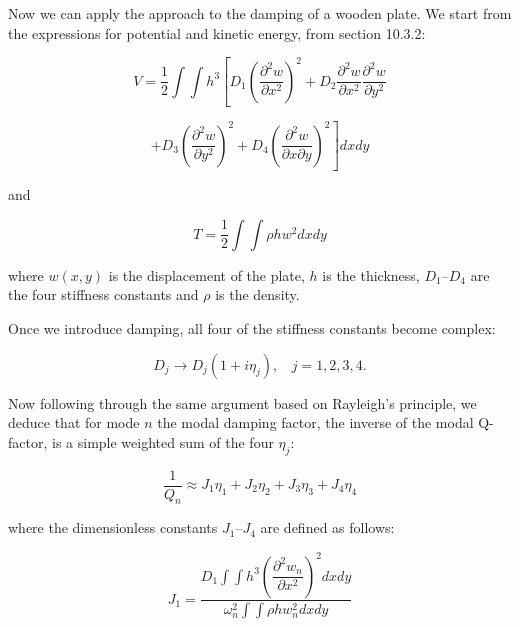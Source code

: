   Now we can apply the approach to the damping of a wooden plate. We start from 
  the expressions for potential and kinetic energy, from section 10.3.2: 

  \begin{equation*} V = \dfrac{1}{2} \int{\int{h^3 \left[ D_1 
  \left(\dfrac{\partial^2 w}{\partial x^2} \right)^2 + D_2 \dfrac{\partial^2 
  w}{\partial x^2} \dfrac{\partial^2 w}{\partial y^2} \right. }} 
  \end{equation*} 

  \begin{equation*} \left. + D_3 \left(\dfrac{\partial^2 w}{\partial y^2} 
  \right)^2 + D_4 \left(\dfrac{\partial^2 w}{\partial x \partial y} \right)^2 
  \right] dx dy \tag{7}\end{equation*} 

  \noindent{}and 

  \begin{equation*}T=\dfrac{1}{2} \int{\int{ \rho h w^2 dx dy }} 
  \tag{8}\end{equation*} 

  \noindent{}where $w(x,y)$ is the displacement of the plate, $h$ is the 
  thickness, $D_1$--$D_4$ are the four stiffness constants and $\rho$ is the 
  density. 

  Once we introduce damping, all four of the stiffness constants become 
  complex: 

  \begin{equation*}D_j \rightarrow D_j(1+i \eta_j) \mathrm{,~~~~} j=1,2,3,4 . 
  \tag{9}\end{equation*} 

  Now following through the same argument based on Rayleigh's principle, we 
  deduce that for mode $n$ the modal damping factor, the inverse of the modal 
  Q-factor, is a simple weighted sum of the four $\eta_j$: 

  \begin{equation*}\dfrac{1}{Q_n} \approx J_1 \eta_1 + J_2 \eta_2 + J_3 \eta_3 
  + J_4 \eta_4 \tag{10}\end{equation*} 

  \noindent{}where the dimensionless constants $J_1$--$J_4$ are defined as 
  follows: 

  \begin{equation*}J_1 = \dfrac{D_1 \int{\int{h^3 \left(\dfrac{\partial^2 
  w_n}{\partial x^2} \right)^2 dx dy }}}{\omega_n^2 \int{ \int{ \rho h w_n^2 dx 
  dy }}} \tag{11}\end{equation*} 

